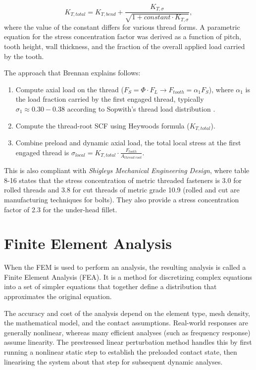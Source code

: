 \documentclass[a4paper,twoside]{bth}
\begin{document}
\begin{equation}
    K_{T, total} = K_{T, bend} + \frac{K_{T, \sigma}}{\sqrt{1 + constant\cdot K_{T, \sigma}}},
\end{equation}
where the value of the constant differs for various thread forms. A parametric equation for the stress concentration factor was derived as a function of pitch, tooth height, wall thickness, and the fraction of the overall applied load carried by the tooth.

The approach that Brennan explains follows:
\begin{enumerate}
    \item Compute axial load on the thread ($F_S = \Phi\cdot F_L \rightarrow F_{tooth} = \alpha_1F_S$), where $\alpha_1$ is the load fraction carried by the first engaged thread, typically $\sigma_1 \approx 0.30 - 0.38$ according to Sopwith's thread load distribution \cite{brennan_fatigue_nodate}.
    \item Compute the thread-root \ac{SCF} using Heywoods formula ($K_{T, total}$).
    \item Combine preload and dynamic axial load, the total local stress at the first engaged thread is $\sigma_{local} = K_{T, total} \cdot \frac{F_{tooth}}{A_{thread\; root}}$.
\end{enumerate}


This is also compliant with \textit{Shigleys Mechanical Engineering Design}, where table 8-16 states that the stress concentration of metric threaded fasteners is 3.0 for rolled threads and 3.8 for cut threads of metric grade 10.9 \cite[p.437]{budynas_shigleys_2015} (rolled and cut are manufacturing techniques for bolts). They also provide a stress concentration factor of 2.3 for the under-head fillet.


\section{Finite Element Analysis} \label{sec:FEA}
When the \ac{FEM} is used to perform an analysis, the resulting analysis is called a Finite Element Analysis (FEA). It is a method for discretizing complex equations into a set of simpler equations that together define a distribution that approximates the original equation.

The accuracy and cost of the analysis depend on the element type, mesh density, the mathematical model, and the contact assumptions. Real-world responses are generally nonlinear, whereas many efficient analyses (such as frequency response) assume linearity. The prestressed linear perturbation method handles this by first running a nonlinear static step to establish the preloaded contact state, then linearising the system about that step for subsequent dynamic analyses. 
\end{document}
